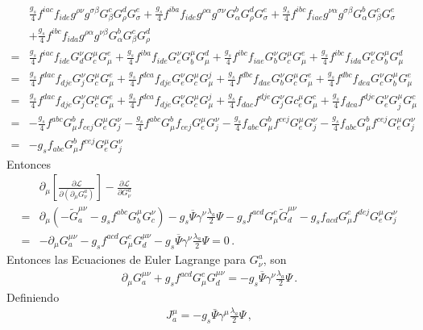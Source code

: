 \begin{align}
  &\frac{g_s}{4}f^{iac}f_{ide}g^{\rho\nu}g^{\sigma\beta}G^c_\beta G^d_\rho G^e_\sigma
+\frac{g_s}{4}f^{iba}f_{ide}g^{\rho\alpha}g^{\sigma\nu}G^b_{\alpha}G^d_\rho G^e_\sigma
+\frac{g_s}{4}f^{ibc}f_{iae}g^{\nu\alpha}g^{\sigma\beta}G^b_{\alpha}G^c_\beta G^e_\sigma\nonumber\\
&+\frac{g_s}{4}f^{ibc}f_{ida}g^{\rho\alpha}g^{\nu\beta}G^b_{\alpha}G^c_\beta G^d_\rho\nonumber\\
=&\frac{g_s}{4}f^{iac}f_{ide}G_d^\nu G_c^\mu G^e_\mu
+\frac{g_s}{4}f^{iba}f_{ide}G_e^\nu G_b^{\mu}G^d_\mu
+\frac{g_s}{4}f^{ibc}f_{iae}G_b^{\nu}G_c^\mu G^e_\mu
+\frac{g_s}{4}f^{ibc}f_{ida}G_c^\nu G_b^{\mu}G^d_\mu\nonumber\\
=&  \frac{g_s}{4}f^{dac}f_{dje}G_j^\nu G_c^\mu G^e_\mu
+\frac{g_s}{4}f^{dca}f_{dje}G_e^\nu G_c^{\mu}G^j_\mu
+\frac{g_s}{4}f^{dbc}f_{dae}G_b^{\nu}G_c^\mu G^e_\mu
+\frac{g_s}{4}f^{dbc}f_{dea}G_c^\nu G_b^{\mu}G^e_\mu\nonumber\\
=&  \frac{g_s}{4}f^{dac}f_{dje}G_j^\nu G_c^\mu G^e_\mu
+\frac{g_s}{4}f^{dca}f_{dje}G_e^\nu G_c^{\mu}G^j_\mu
+\frac{g_s}{4}f_{dac}f^{dje}G_j^{\nu}Gc_e^\mu G^c_\mu
+\frac{g_s}{4}f_{dca}f^{dje}G_e^\nu G_j^{\mu}G^c_\mu\nonumber\\
=&  -\frac{g_s}{4}f^{abc}G^b_\mu f_{cej}G_e^\mu G_j^\nu
-\frac{g_s}{4}f^{abc}G^b_{\mu}f_{cej}G_e^\mu G_j^\nu
-\frac{g_s}{4}f_{abc}G^b_\mu f^{cej}G_e^\mu G_j^{\nu}
-\frac{g_s}{4}f_{abc}G^b_\mu f^{cej}G_e^{\mu}G_j^\nu\nonumber\\
=&-g_sf_{abc}G^b_\mu f^{cej}G_e^{\mu}G_j^\nu
\end{align}
Entonces
\begin{align}
    &\partial_\mu\left[\frac{\partial\mathcal{L}}{\partial\left(\partial_\mu G_\nu^a\right)}\right]-\frac{\partial\mathcal{L}}{\partial G_\nu^a}\nonumber\\
    =&\partial_\mu\left(-  \widetilde{G}^{\mu\nu}_a-g_s f^{abc}G_b^\mu G^\nu_c
\right)
-g_s\overline{\Psi}\gamma^\nu\frac{\lambda_a}{2}\Psi
-g_s f^{acd}G^c_\mu\widetilde{G}^{\mu\nu}_d
-g_sf_{acd}G^c_\mu f^{dej}G_e^{\mu}G_j^\nu\nonumber\\
      =&-\partial_\mu{G}^{\mu\nu}_a-g_s f^{acd}G^c_\mu{G}^{\mu\nu}_d
-g_s\overline{\Psi}\gamma^\nu\frac{\lambda_a}{2}\Psi=0\,.
\end{align}
Entonces las Ecuaciones de Euler Lagrange para $G_\nu^a$, son
\begin{align}
\label{eq:Gmuael}
\partial_\mu{G}^{\mu\nu}_a+g_s f^{acd}G^c_\mu{G}^{\mu\nu}_d
=-g_s\overline{\Psi}\gamma^\nu\frac{\lambda_a}{2}\Psi\,.
\end{align}
Definiendo
\begin{align}
J^\mu_a = -g_s\bar{\Psi}\gamma^\mu\frac{\lambda_a}{2}\Psi\,,
\end{align}

